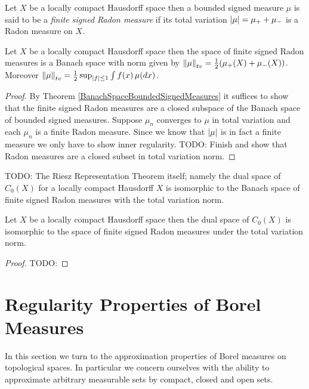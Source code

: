\begin{defn}Let $X$ be a locally compact Hausdorff space then a
  bounded signed
  measure $\mu$ is said to be a \emph{finite signed Radon measure} if its
  total variation $\left \vert \mu \right \vert = \mu_+ + \mu_-$ is a Radon measure on $X$.
\end{defn}

\begin{thm}\label{BanachSpaceRadonMeasuresLCH}Let $X$ be a locally compact Hausdorff space then the space
  of finite signed Radon measures is a Banach space with norm given by
  $\left \lVert  \mu \right \rVert_{tv} = \frac{1}{2}(\mu_+(X) + \mu_-(X))$.  Moreover $\left \lVert  \mu \right \rVert_{tv} = \frac{1}{2}\sup_{\left \vert f \right \vert \leq 1} \int f (x) \, \mu(dx)$.
\end{thm}
\begin{proof}
By Theorem \ref{BanachSpaceBoundedSignedMeasures} it suffices to show that the finite signed Radon measures are a closed subspace of the 
Banach space of bounded signed measures.
Suppose $\mu_n$ converges to $\mu$ in total variation and each $\mu_n$ is a finite Radon measure.  Since we know that $\left \vert \mu \right \vert$ is in fact a finite measure we only have to show inner regularity.
TODO: Finish and show that Radon measures are a closed subset in total variation norm.
\end{proof}

TODO: The Riesz Representation Theorem itself; namely the dual space of $C_0(X)$ for a locally compact Hausdorff $X$ is 
isomorphic to the Banach space of finite signed Radon measures with
the total variation norm.
\begin{thm}\label{RieszRepresentationLCH}Let $X$ be a locally compact
  Hausdorff space then the dual space of $C_0(X)$ is isomorphic to the
  space of finite signed Radon measures under the total variation norm.
\end{thm}
\begin{proof}
TODO:
\end{proof}

\section{Regularity Properties of Borel Measures}

In this section we turn to the approximation properties of Borel measures on topological spaces.  In particular we
concern ourselves with the ability to approximate arbitrary measurable sets by compact, closed and open sets.


